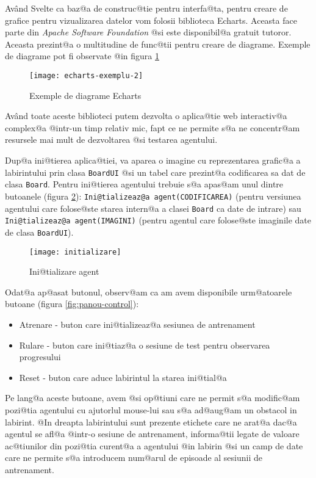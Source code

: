Av\^ and Svelte ca baz@a de construc@tie pentru interfa@ta, pentru creare de grafice pentru vizualizarea datelor vom folosii biblioteca Echarts. Aceasta face parte din \textsl{Apache Software Foundation} @si este disponibil@a gratuit tutoror. Aceasta prezint@a o multitudine de func@tii pentru creare de diagrame. Exemple de diagrame pot fi observate @in figura \ref{fig:echarts-exemplu-2} 

\begin{figure}[h]
	\centering
	\texttt{[image: echarts-exemplu-2]}
	\caption{Exemple de diagrame Echarts \cite{diagrame-exemplu}}
	\label{fig:echarts-exemplu-2}
\end{figure}

Av\^and toate aceste biblioteci putem dezvolta o aplica@tie web interactiv@a complex@a @intr-un timp relativ mic, fapt ce ne permite s@a ne concentr@am resursele mai mult de dezvoltarea @si testarea agentului.

Dup@a ini@tierea aplica@tiei, va aparea o imagine cu reprezentarea grafic@a a labirintului prin clasa \texttt{BoardUI} @si un tabel care prezint@a codificarea sa dat de clasa \texttt{Board}. Pentru ini@tierea agentului trebuie s@a apas@am unul dintre butoanele (figura \ref{fig:initializare}): \texttt{Ini@tializeaz@a agent(CODIFICAREA)} (pentru versiunea agentului care folose@ste starea intern@a a clasei \texttt{Board} ca date de intrare) sau \texttt{Ini@tializeaz@a agent(IMAGINI)} (pentru agentul care folose@ste imaginile date de clasa \texttt{BoardUI}).

\begin{figure}[h]
	\centering
	\texttt{[image: initializare]}
	\caption{Ini@tializare agent}
	\label{fig:initializare}
\end{figure}


Odat@a ap@asat butonul, observ@am ca am avem disponibile urm@atoarele butoane (figura \ref{fig:panou-control}):
\begin{itemize}
	\item Atrenare - buton care ini@tializeaz@a sesiunea de antrenament
	\item Rulare - buton care ini@tiaz@a o sesiune de test pentru observarea progresului
	\item Reset - buton care aduce labirintul la starea ini@tial@a
\end{itemize}

Pe lang@a aceste butoane, avem @si op@tiuni care ne permit s@a modific@am pozi@tia agentului cu ajutorlul mouse-lui sau s@a ad@aug@am un obstacol in labirint. @In dreapta labirintului sunt prezente etichete care ne arat@a dac@a agentul se afl@a @intr-o sesiune de antrenament, informa@tii legate de valoare ac@tiunilor din pozi@tia curent@a a agentului @in labirin @si un camp de date care ne permite s@a introducem num@arul de episoade al sesiunii de antrenament.

